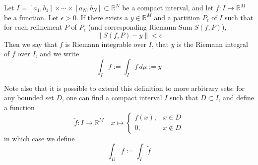 \documentclass[12pt]{article}
\newcommand{\R}{\mathbb{R}}
\begin{document}
Let $I = [a_1, b_1] \times \cdots \times [a_N, b_N] \subset \R^N$ be a compact interval, and let $f:I\to\R^M$ be a function. Let $\epsilon > 0$. If there exists a $y \in \R^M$ and a partition $P_\epsilon$ of $I$ such that for each refinement $P$ of $P_\epsilon$ (and corresponding Riemann Sum $S(f, P)$),
\[
\left\|S(f,P) - y\right\| < \epsilon
\]
Then we say that $f$ is Riemann integrable over $I$, that $y$ is the Riemann integral of $f$ over $I$, and we write
\[
\int_I f := \int_I f\, d\mu := y
\]

Note also that it is possible to extend this definition to more arbitrary sets; for any bounded set $D$, one can find a compact interval $I$ such that $D \subset I$, and define a function
\[
\tilde{f}:I\to\R^M\quad x \mapsto
\begin{cases}
f(x),& x \in D \\
0, &x \notin D
\end{cases}
\]
in which case we define
\[
\int_D f := \int_I \tilde{f}
\]
\end{document}
